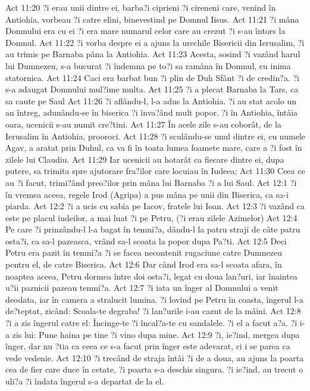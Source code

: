 Act 11:20  ?i erau unii dintre ei, barba?i ciprieni ?i cireneni care, venind în Antiohia, vorbeau ?i catre elini, binevestind pe Domnul Iisus.
Act 11:21  ?i mâna Domnului era cu ei ?i era mare numarul celor care au crezut ?i s-au întors la Domnul.
Act 11:22  ?i vorba despre ei a ajuns la urechile Bisericii din Ierusalim, ?i au trimis pe Barnaba pâna la Antiohia.
Act 11:23  Acesta, sosind ?i vazând harul lui Dumnezeu, s-a bucurat ?i îndemna pe to?i sa ramâna în Domnul, cu inima statornica.
Act 11:24  Caci era barbat bun ?i plin de Duh Sfânt ?i de credin?a. ?i s-a adaugat Domnului mul?ime multa.
Act 11:25  ?i a plecat Barnaba la Tars, ca sa caute pe Saul
Act 11:26  ?i aflându-l, l-a adus la Antiohia. ?i au stat acolo un an întreg, adunându-se în biserica ?i înva?ând mult popor. ?i în Antiohia, întâia oara, ucenicii s-au numit cre?tini.
Act 11:27  În acele zile s-au coborât, de la Ierusalim în Antiohia, prooroci.
Act 11:28  ?i sculându-se unul dintre ei, cu numele Agav, a aratat prin Duhul, ca va fi în toata lumea foamete mare, care a ?i fost în zilele lui Claudiu.
Act 11:29  Iar ucenicii au hotarât ca fiecare dintre ei, dupa putere, sa trimita spre ajutorare fra?ilor care locuiau în Iudeea;
Act 11:30  Ceea ce au ?i facut, trimi?ând preo?ilor prin mâna lui Barnaba ?i a lui Saul.
Act 12:1  ?i în vremea aceea, regele Irod (Agripa) a pus mâna pe unii din Biserica, ca sa-i piarda.
Act 12:2  ?i a ucis cu sabia pe Iacov, fratele lui Ioan.
Act 12:3  ?i vazând ca este pe placul iudeilor, a mai luat ?i pe Petru, (?i erau zilele Azimelor)
Act 12:4  Pe care ?i prinzându-l l-a bagat în temni?a, dându-l la patru straji de câte patru osta?i, ca sa-l pazeasca, vrând sa-l scoata la popor dupa Pa?ti.
Act 12:5  Deci Petru era pazit în temni?a ?i se facea necontenit rugaciune catre Dumnezeu pentru el, de catre Biserica.
Act 12:6  Dar când Irod era sa-l scoata afara, în noaptea aceea, Petru dormea între doi osta?i, legat cu doua lan?uri, iar înaintea u?ii paznicii pazeau temni?a.
Act 12:7  ?i iata un înger al Domnului a venit deodata, iar în camera a stralucit lumina. ?i lovind pe Petru în coasta, îngerul l-a de?teptat, zicând: Scoala-te degraba! ?i lan?urile i-au cazut de la mâini.
Act 12:8  ?i a zis îngerul catre el: Încinge-te ?i încal?a-te cu sandalele. ?i el a facut a?a. ?i i-a zis lui: Pune haina pe tine ?i vino dupa mine.
Act 12:9  ?i, ie?ind, mergea dupa înger, dar nu ?tia ca ceea ce s-a facut prin înger este adevarat, ci i se parea ca vede vedenie.
Act 12:10  ?i trecând de straja întâi ?i de a doua, au ajuns la poarta cea de fier care duce în cetate, ?i poarta s-a deschis singura. ?i ie?ind, au trecut o uli?a ?i îndata îngerul s-a departat de la el.
